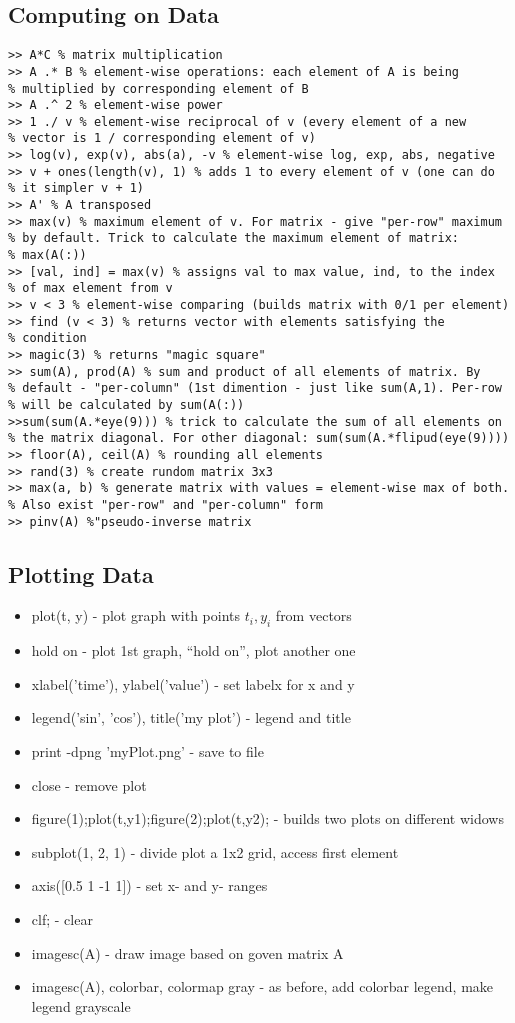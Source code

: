 \documentclass{scrartcl}
\begin{document}
\subsection{Computing on Data}
\label{5-3}
\begin{verbatim}
>> A*C % matrix multiplication
>> A .* B % element-wise operations: each element of A is being
% multiplied by corresponding element of B
>> A .^ 2 % element-wise power
>> 1 ./ v % element-wise reciprocal of v (every element of a new
% vector is 1 / corresponding element of v)
>> log(v), exp(v), abs(a), -v % element-wise log, exp, abs, negative
>> v + ones(length(v), 1) % adds 1 to every element of v (one can do
% it simpler v + 1)
>> A' % A transposed
>> max(v) % maximum element of v. For matrix - give "per-row" maximum
% by default. Trick to calculate the maximum element of matrix:
% max(A(:))
>> [val, ind] = max(v) % assigns val to max value, ind, to the index
% of max element from v
>> v < 3 % element-wise comparing (builds matrix with 0/1 per element)
>> find (v < 3) % returns vector with elements satisfying the
% condition
>> magic(3) % returns "magic square"
>> sum(A), prod(A) % sum and product of all elements of matrix. By
% default - "per-column" (1st dimention - just like sum(A,1). Per-row
% will be calculated by sum(A(:))
>>sum(sum(A.*eye(9))) % trick to calculate the sum of all elements on
% the matrix diagonal. For other diagonal: sum(sum(A.*flipud(eye(9))))
>> floor(A), ceil(A) % rounding all elements
>> rand(3) % create rundom matrix 3x3
>> max(a, b) % generate matrix with values = element-wise max of both.
% Also exist "per-row" and "per-column" form
>> pinv(A) %"pseudo-inverse matrix 
\end{verbatim}

\subsection{Plotting Data}
\label{5-4}
\begin{itemize}
\item{plot(t, y)} - plot graph with points $t_i, y_i$ from vectors
\item{hold on} - plot 1st graph, ``hold on'', plot another one
\item{xlabel('time'), ylabel('value')} - set labelx for x and y
\item{legend('sin', 'cos'), title('my plot')} - legend and title
\item{print -dpng 'myPlot.png'} - save to file
\item{close} - remove plot
\item{figure(1);plot(t,y1);figure(2);plot(t,y2);} - builds two plots
  on different widows
\item{subplot(1, 2, 1)} - divide plot a 1x2 grid, access first element
\item{axis([0.5 1 -1 1])} - set x- and y- ranges
\item{clf;} - clear
\item{imagesc(A)} - draw image based on goven matrix A
\item{imagesc(A), colorbar, colormap gray} - as before, add colorbar
  legend, make legend grayscale
\end{itemize}
\end{document}
